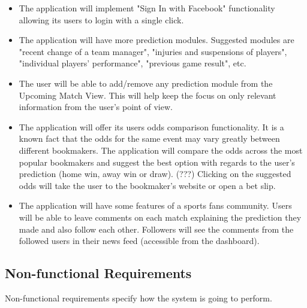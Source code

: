 \begin{itemize}
    \item The application will implement "Sign In with Facebook" functionality allowing its users to login with a single click.
    \item The application will have more prediction modules. Suggested modules are "recent change of a team manager", "injuries and suspensions of players", "individual players' performance", "previous game result", etc.
    \item The user will be able to add/remove any prediction module from the Upcoming Match View. This will help keep the focus on only relevant information from the user's point of view.
    \item The application will offer its users odds comparison functionality. It is a known fact that the odds for the same event may vary greatly between different bookmakers. The application will compare the odds across the most popular bookmakers and suggest the best option with regards to the user's prediction (home win, away win or draw). (???) Clicking on the suggested odds will take the user to the bookmaker's website or open a bet slip.
    \item The application will have some features of a sports fans community. Users will be able to leave comments on each match explaining the prediction they made and also follow each other. Followers will see the comments from the followed users in their news feed (accessible from the dashboard).
\end{itemize}

\subsection{Non-functional Requirements}
\label{sec:nonfunctional_req}
Non-functional requirements specify how the system is going to perform. 

